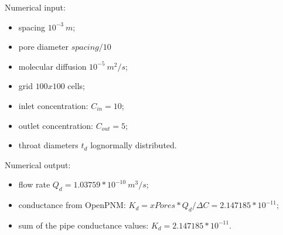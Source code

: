 \documentclass{article}
\begin{document}
Numerical input:
\begin{itemize}
    \item spacing $10^{-3} \: m$;
    \item pore diameter $spacing/10$
    \item molecular diffusion $10^{-5} \: m^2/s$;
    \item grid $100x100$ cells;
    \item inlet concentration: $C_{in}=10$;
    \item outlet concentration: $C_{out}=5$;
    \item throat diameters $t_d$ lognormally distributed.
\end{itemize}
Numerical output:
\begin{itemize}
    \item flow rate $Q_d = 1.03759 * 10^{-10} \: m^3/s$;
    \item conductance from OpenPNM: $K_d = xPores *Q_d/\Delta C = 2.147185 * 10^{-11}$;
    \item sum of the pipe conductance values: $K_d = 2.147185 * 10^{-11}$.
\end{itemize}

\FloatBarrier  %
\end{document}
